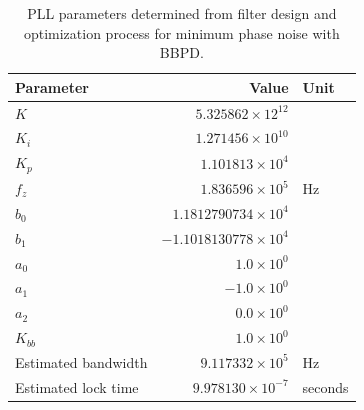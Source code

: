 		\begin{table}[h!]
			\centering
			\def\arraystretch{1.5}		
			\setlength\arrayrulewidth{0.75pt}
			\setlength{\tabcolsep}{1em} %
			\begin{tabular}{|l|r|l|}
				\hline 
				\rule[-1ex]{0pt}{2.5ex} \cellcolor{gray!40}\textbf{Parameter} & \cellcolor{gray!40}\textbf{Value} & \cellcolor{gray!40}\textbf{Unit }\\ 
				\hline 
				\rule[-1ex]{0pt}{2.5ex} \textbf{$K$}  & $5.325862\times12^{12}$ &  \\
				\hline 
				\rule[-1ex]{0pt}{2.5ex} \textbf{$K_i$}  & $1.271456\times10^{10}$ &  \\
				\hline 
				\rule[-1ex]{0pt}{2.5ex} \textbf{$K_p$}  & $1.101813\times10^{4}$ &  \\
				\hline 
				\rule[-1ex]{0pt}{2.5ex} \textbf{$f_z$} & $1.836596\times10^5$ & Hz\\
				\hline 
				\rule[-1ex]{0pt}{2.5ex} \textbf{$b_0$}  & $1.1812790734\times10^4$  &\\
				\hline 
				\rule[-1ex]{0pt}{2.5ex} \textbf{$b_1$}  & $-1.1018130778\times10^4$  & \\
				\hline 
				\rule[-1ex]{0pt}{2.5ex} \textbf{$a_0$}  & $1.0\times10^0$  &\\ 
				\hline 
				\rule[-1ex]{0pt}{2.5ex} \textbf{$a_1$}  & $-1.0\times10^0$  & \\ 
				\hline 
				\rule[-1ex]{0pt}{2.5ex} \textbf{$a_2$}  & $0.0\times10^0$  & \\ 
				\hline 
				\rule[-1ex]{0pt}{2.5ex} \textbf{$K_{bb}$}  & $1.0\times10^0$  & \\ 
				\hline 
				\rule[-1ex]{0pt}{2.5ex} Estimated bandwidth & $9.117332\times10^5$ & Hz \\
				\hline 
				\rule[-1ex]{0pt}{2.5ex} Estimated lock time & $9.978130\times10^{-7}$ & seconds \\
				\hline 
			\end{tabular} 
			\caption{PLL parameters determined from filter design and optimization process for minimum phase noise with BBPD.}
			\label{filter_params_bbpd_low_noise}
		\end{table}   

